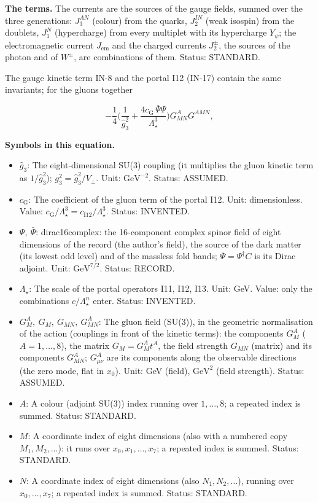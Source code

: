 \documentclass[
  10pt,
]{article}
\providecommand{\tightlist}{%
  \setlength{\itemsep}{0pt}\setlength{\parskip}{0pt}}
\begin{document}
\textbf{The terms.} The currents are the sources of the gauge fields,
summed over the three generations: \(J_3^{AN}\) (colour) from the
quarks, \(J_2^{IN}\) (weak isospin) from the doublets, \(J_1^N\)
(hypercharge) from every multiplet with its hypercharge \(Y_\psi\); the
electromagnetic current \(J_{\mathrm{em}}\) and the charged currents
\(J_2^\pm\), the sources of the photon and of \(W^\pm\), are
combinations of them. Status: STANDARD.

The gauge kinetic term IN-8 and the portal I12 (IN-17) contain the same
invariants; for the gluons together

\[
-\frac14\Big(\frac{1}{\hat g_3^2} + \frac{4c_{\mathrm{G}}\,\bar\Psi\Psi}{\Lambda_\star^3}\Big)G^A_{MN}G^{AMN},
\]

\textbf{Symbols in this equation.}

\begin{itemize}
\tightlist
\item
  \(\hat g_3\): The eight-dimensional SU(3) coupling (it multiplies the
  gluon kinetic term as \(1/\hat g_3^2\));
  \(g_3^2 = \hat g_3^2/V_\perp\). Unit: \(\mathrm{GeV}^{-2}\). Status:
  ASSUMED.
\item
  \(c_{\mathrm{G}}\): The coefficient of the gluon term of the portal
  I12. Unit: dimensionless. Value:
  \(c_{\mathrm{G}}/\Lambda_\star^3 = c_{\mathrm{I12}}/\Lambda_\star^3\).
  Status: INVENTED.
\item
  \(\Psi,\ \bar\Psi\): dirac16complex: the 16-component complex spinor
  field of eight dimensions of the record (the author's field), the
  source of the dark matter (its lowest odd level) and of the massless
  fold bands; \(\bar\Psi = \Psi^\dagger C\) is its Dirac adjoint. Unit:
  \(\mathrm{GeV}^{7/2}\). Status: RECORD.
\item
  \(\Lambda_\star\): The scale of the portal operators I11, I12, I13.
  Unit: GeV. Value: only the combinations \(c/\Lambda_\star^n\) enter.
  Status: INVENTED.
\item
  \(G^A_M,\ G_M,\ G_{MN},\ G^A_{MN}\): The gluon field (SU(3)), in the
  geometric normalisation of the action (couplings in front of the
  kinetic terms): the components \(G^A_M\) (\(A = 1, \dots, 8\)), the
  matrix \(G_M = G^A_Mt^A\), the field strength \(G_{MN}\) (matrix) and
  its components \(G^A_{MN}\); \(G^A_{\mu\nu}\) are its components along
  the observable directions (the zero mode, flat in \(x_0\)). Unit: GeV
  (field), \(\mathrm{GeV}^{2}\) (field strength). Status: ASSUMED.
\item
  \(A\): A colour (adjoint SU(3)) index running over \(1, \dots, 8\); a
  repeated index is summed. Status: STANDARD.
\item
  \(M\): A coordinate index of eight dimensions (also with a numbered
  copy \(M_1, M_2, \dots\)): it runs over \(x_0, x_1, \dots, x_7\); a
  repeated index is summed. Status: STANDARD.
\item
  \(N\): A coordinate index of eight dimensions (also
  \(N_1, N_2, \dots\)), running over \(x_0, \dots, x_7\); a repeated
  index is summed. Status: STANDARD.
\end{itemize}
\end{document}
